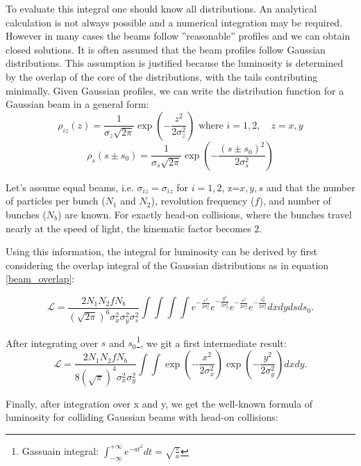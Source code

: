 To evaluate this integral one should know all distributions. An analytical calculation is not always possible and a numerical integration may be required. However in many cases the beams follow ”reasonable” profiles and we can obtain closed solutions. It is often assumed that the beam profiles follow Gaussian distributions. This assumption is justified because the luminosity is determined by the overlap of the core of the distributions, with the tails contributing minimally.
Given Gaussian profiles, we can write the distribution function for a Gaussian beam in a general form:
\begin{equation}
\rho_{iz}(z) =\frac{1}{\sigma_z\sqrt{2\pi}} \exp\left( -\frac{z^2}{2 \sigma_z^2} \right) \text{ where } i=1,2, \quad z=x,y
\end{equation}
\begin{equation}
\rho_{s}(s\pm s_0) =\frac{1}{\sigma_s\sqrt{2\pi}} \exp\left( -\frac{(s\pm s_0)^2}{2 \sigma_s^2} \right)
\end{equation}

Let's assume equal beams, i.e.  $\sigma_{iz} = \sigma_{iz}$ for $i=1,2$, z=$x,y,s$ and that the number of particles per bunch (\( N_1 \) and \( N_2 \)), revolution frequency (\( f \)), and number of bunches (\( N_b \)) are known. For exactly head-on collisions, where the bunches travel nearly at the speed of light, the kinematic factor becomes 2.

Using this information, the integral for luminosity can be derived by first considering the overlap integral of the Gaussian distributions as in equation \eqref{beam_overlap}:

\begin{equation}
\mathcal{L} = \frac{2  N_1 N_2 f N_b}{(\sqrt{2\pi})^6 \sigma_x^2\sigma_y^2\sigma_s^2}\int\int\int\int e^{-\frac{x^2}{2 \sigma_x^2}} e^{-\frac{y^2}{2 \sigma_y^2}} e^{-\frac{s^2}{2 \sigma_s^2}}e^{-\frac{s_0^2}{2 \sigma_s^2}}dxdydsds_0.
\end{equation}

After integrating over $s$ and $s_0$\footnote{Gassuain integral: $\int_{-\infty}^{+\infty}e^{-at^2}dt = \sqrt{\tfrac{\pi}{a}}$}, we git a first intermediate result:
\begin{equation}
    \mathcal{L} = \frac{2  N_1 N_2 f N_b}{8(\sqrt{\pi})^4 \sigma_x^2\sigma_y^2}\int\int \exp\left(-\frac{x^2}{2 \sigma_x^2}\right) \exp\left(-\frac{y^2}{2 \sigma_y^2}\right) dxdy .
\end{equation}

Finally, after integration over x and y, we get the well-known formula of luminosity for colliding Gaussian beams with head-on collisions:

